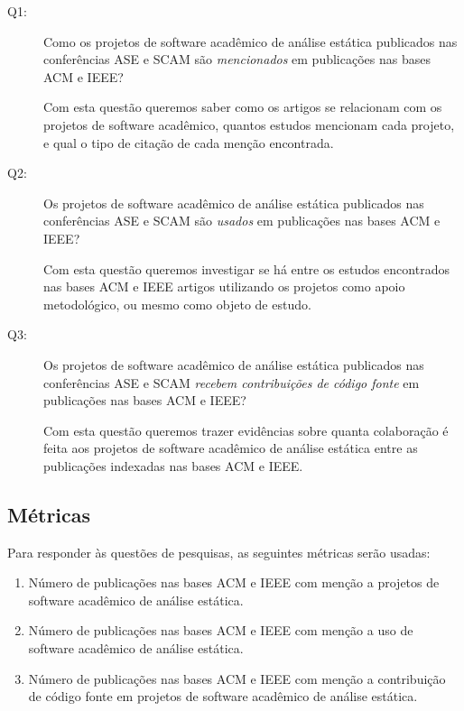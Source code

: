 \newcommand{\EstudoDoisQuestaoUm}{
  Como os projetos de software acadêmico de análise estática publicados nas
  conferências ASE e SCAM são \textit{mencionados} em publicações nas bases ACM e IEEE?
}
\newcommand{\EstudoDoisQuestaoDois}{
  Os projetos de software acadêmico de análise estática publicados nas
  conferências ASE e SCAM são \textit{usados} em publicações nas bases ACM e IEEE?
}
\newcommand{\EstudoDoisQuestaoTres}{
  Os projetos de software acadêmico de análise estática publicados nas
  conferências ASE e SCAM \textit{recebem contribuições de código fonte} em publicações
  nas bases ACM e IEEE?
}

\begin{description}
  \item [Q1:] \EstudoDoisQuestaoUm

    Com esta questão queremos saber como os artigos se relacionam com os projetos
    de software acadêmico, quantos estudos mencionam cada projeto, e qual o tipo
    de citação de cada menção encontrada.

  \item [Q2:] \EstudoDoisQuestaoDois

    Com esta questão queremos investigar se há entre os estudos encontrados nas bases
    ACM e IEEE artigos utilizando os projetos como apoio metodológico, ou mesmo como
    objeto de estudo.

  \item [Q3:] \EstudoDoisQuestaoTres

    Com esta questão queremos trazer evidências sobre quanta colaboração é
    feita aos projetos de software acadêmico de análise estática entre as
    publicações indexadas nas bases ACM e IEEE.

\end{description}

\subsection{Métricas}

Para responder às questões de pesquisas, as seguintes métricas serão usadas:

\begin{enumerate}
  \item Número de publicações nas bases ACM e IEEE com menção a projetos de
    software acadêmico de análise estática.
  \item Número de publicações nas bases ACM e IEEE com menção a uso de
    software acadêmico de análise estática.
  \item Número de publicações nas bases ACM e IEEE com menção a contribuição de
    código fonte em projetos de software acadêmico de análise estática.
\end{enumerate}


